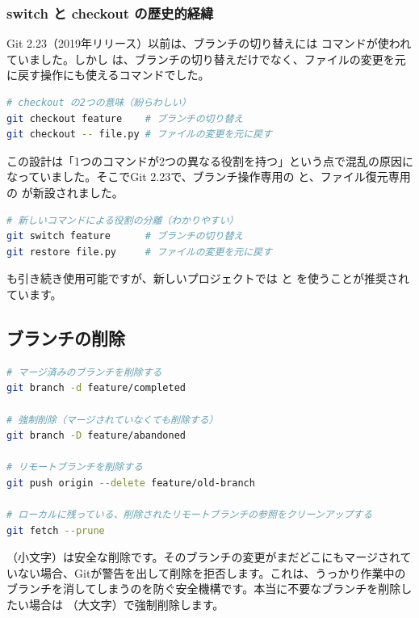 \subsubsection{switch と checkout の歴史的経緯}

Git 2.23（2019年リリース）以前は、ブランチの切り替えには  コマンドが使われていました。しかし  は、ブランチの切り替えだけでなく、ファイルの変更を元に戻す操作にも使えるコマンドでした。

\begin{lstlisting}[language=bash]
# checkout の2つの意味（紛らわしい）
git checkout feature    # ブランチの切り替え
git checkout -- file.py # ファイルの変更を元に戻す
\end{lstlisting}

この設計は「1つのコマンドが2つの異なる役割を持つ」という点で混乱の原因になっていました。そこでGit 2.23で、ブランチ操作専用の  と、ファイル復元専用の  が新設されました。

\begin{lstlisting}[language=bash]
# 新しいコマンドによる役割の分離（わかりやすい）
git switch feature      # ブランチの切り替え
git restore file.py     # ファイルの変更を元に戻す
\end{lstlisting}

 も引き続き使用可能ですが、新しいプロジェクトでは  と  を使うことが推奨されています。

\subsection{ブランチの削除}

\begin{lstlisting}[language=bash]
# マージ済みのブランチを削除する
git branch -d feature/completed

# 強制削除（マージされていなくても削除する）
git branch -D feature/abandoned

# リモートブランチを削除する
git push origin --delete feature/old-branch

# ローカルに残っている、削除されたリモートブランチの参照をクリーンアップする
git fetch --prune
\end{lstlisting}

（小文字）は安全な削除です。そのブランチの変更がまだどこにもマージされていない場合、Gitが警告を出して削除を拒否します。これは、うっかり作業中のブランチを消してしまうのを防ぐ安全機構です。本当に不要なブランチを削除したい場合は （大文字）で強制削除します。

